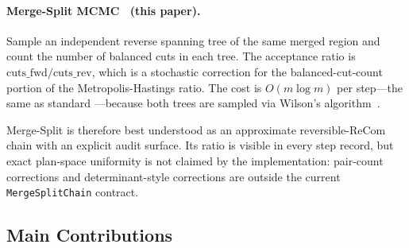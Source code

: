 \paragraph{Merge-Split MCMC~\citep{janson2022} (this paper).}
Sample an independent reverse spanning tree of the same merged region and
count the number of balanced cuts in each tree.
The acceptance ratio is $\mathrm{cuts\_fwd} / \mathrm{cuts\_rev}$, which is
a stochastic correction for the balanced-cut-count portion of the
Metropolis-Hastings ratio.
The cost is $O(m \log m)$ per step---the same as standard \recom{}---because
both trees are sampled via Wilson's algorithm~\citep{wilson1996}.

Merge-Split is therefore best understood as an approximate reversible-ReCom
chain with an explicit audit surface.  Its ratio is visible in every step
record, but exact plan-space uniformity is not claimed by the implementation:
pair-count corrections and determinant-style corrections are outside the
current \texttt{MergeSplitChain} contract.

\subsection{Main Contributions}

